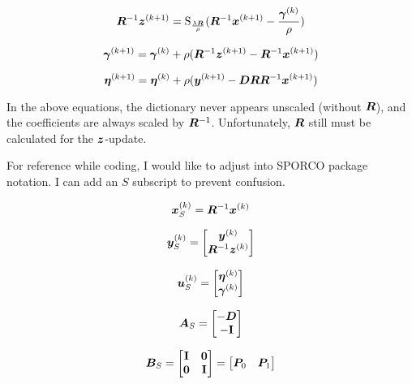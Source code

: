 \documentclass{article}
\begin{document}
\begin{equation}
\bm{R}^{-1}\bm{z}^{(k + 1)}= \operatorname{S}_{\frac{\lambda\bm{R}}{\rho}}(\bm{R}^{-1}\bm{x}^{(k+1)} - \frac{\bm{\gamma}^{(k)}}{\rho})
\end{equation}

\begin{equation}
\bm{\gamma}^{(k + 1)} = \bm{\gamma}^{(k)} + \rho(\bm{R}^{-1}\bm{z}^{(k + 1)} - \bm{R}^{-1}\bm{x}^{(k + 1)})
\end{equation}

\begin{equation}
\bm{\eta}^{(k + 1)} = \bm{\eta}^{(k)} + \rho(\bm{y}^{(k + 1)} - \bm{D}\bm{R}\bm{R}^{-1}\bm{x}^{(k + 1)})
\end{equation}


In the above equations, the dictionary never appears unscaled (without $\bm{R}$), and the coefficients are always scaled by $\bm{R}^{-1}$. Unfortunately,  $\bm{R}$ still must be calculated for the $\bm{z}$-update.

For reference while coding, I would like to adjust into SPORCO package notation. I can add an $S$ subscript to prevent confusion.

\begin{equation}
\bm{x}_S^{(k)} = \bm{R}^{-1}\bm{x}^{(k)}
\end{equation}

\begin{equation}
\bm{y}_S^{(k)} = \begin{bmatrix} \bm{y}^{(k)} \\ \bm{R}^{-1}\bm{z}^{(k)} \end{bmatrix}
\end{equation}

\begin{equation}
\bm{u}_S^{(k)} = \begin{bmatrix} \bm{\eta}^{(k)} \\ \bm{\gamma}^{(k)} \end{bmatrix}
\end{equation}

\begin{equation}
\bm{A}_S = \begin{bmatrix} - \bm{D} \\ -{\bf I} \end{bmatrix}
\end{equation}

\begin{equation}
\bm{B}_S = \begin{bmatrix} {\bf I} & \bm{0} \\ \bm{0} & {\bf I} \end{bmatrix} = \begin{bmatrix} \bm{P}_0 & \bm{P}_1 \end{bmatrix}
\end{equation}
\end{document}
